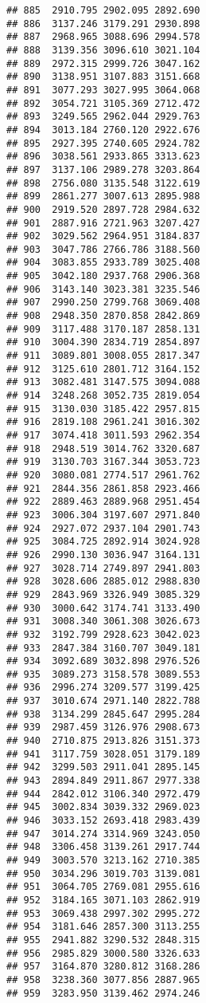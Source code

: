 \documentclass[
]{article}
\begin{document}
\begin{verbatim}
## 885  2910.795 2902.095 2892.690
## 886  3137.246 3179.291 2930.898
## 887  2968.965 3088.696 2994.578
## 888  3139.356 3096.610 3021.104
## 889  2972.315 2999.726 3047.162
## 890  3138.951 3107.883 3151.668
## 891  3077.293 3027.995 3064.068
## 892  3054.721 3105.369 2712.472
## 893  3249.565 2962.044 2929.763
## 894  3013.184 2760.120 2922.676
## 895  2927.395 2740.605 2924.782
## 896  3038.561 2933.865 3313.623
## 897  3137.106 2989.278 3203.864
## 898  2756.080 3135.548 3122.619
## 899  2861.277 3007.613 2895.988
## 900  2919.520 2897.728 2984.632
## 901  2887.916 2721.963 3207.427
## 902  3029.562 2964.951 3184.837
## 903  3047.786 2766.786 3188.560
## 904  3083.855 2933.789 3025.408
## 905  3042.180 2937.768 2906.368
## 906  3143.140 3023.381 3235.546
## 907  2990.250 2799.768 3069.408
## 908  2948.350 2870.858 2842.869
## 909  3117.488 3170.187 2858.131
## 910  3004.390 2834.719 2854.897
## 911  3089.801 3008.055 2817.347
## 912  3125.610 2801.712 3164.152
## 913  3082.481 3147.575 3094.088
## 914  3248.268 3052.735 2819.054
## 915  3130.030 3185.422 2957.815
## 916  2819.108 2961.241 3016.302
## 917  3074.418 3011.593 2962.354
## 918  2948.519 3014.762 3320.687
## 919  3130.703 3167.344 3053.723
## 920  3080.081 2774.517 2961.762
## 921  2844.356 2861.858 2923.466
## 922  2889.463 2889.968 2951.454
## 923  3006.304 3197.607 2971.840
## 924  2927.072 2937.104 2901.743
## 925  3084.725 2892.914 3024.928
## 926  2990.130 3036.947 3164.131
## 927  3028.714 2749.897 2941.803
## 928  3028.606 2885.012 2988.830
## 929  2843.969 3326.949 3085.329
## 930  3000.642 3174.741 3133.490
## 931  3008.340 3061.308 3026.673
## 932  3192.799 2928.623 3042.023
## 933  2847.384 3160.707 3049.181
## 934  3092.689 3032.898 2976.526
## 935  3089.273 3158.578 3089.553
## 936  2996.274 3209.577 3199.425
## 937  3010.674 2971.140 2822.788
## 938  3134.299 2845.647 2995.284
## 939  2987.459 3126.976 2908.673
## 940  2710.875 2913.826 3151.373
## 941  3117.759 3028.051 3179.189
## 942  3299.503 2911.041 2895.145
## 943  2894.849 2911.867 2977.338
## 944  2842.012 3106.340 2972.479
## 945  3002.834 3039.332 2969.023
## 946  3033.152 2693.418 2983.439
## 947  3014.274 3314.969 3243.050
## 948  3306.458 3139.261 2917.744
## 949  3003.570 3213.162 2710.385
## 950  3034.296 3019.703 3139.081
## 951  3064.705 2769.081 2955.616
## 952  3184.165 3071.103 2862.919
## 953  3069.438 2997.302 2995.272
## 954  3181.646 2857.300 3113.255
## 955  2941.882 3290.532 2848.315
## 956  2985.829 3000.580 3326.633
## 957  3164.870 3280.812 3168.286
## 958  3238.360 3077.856 2887.965
## 959  3283.950 3139.462 2974.246

\end{verbatim}
\end{document}
